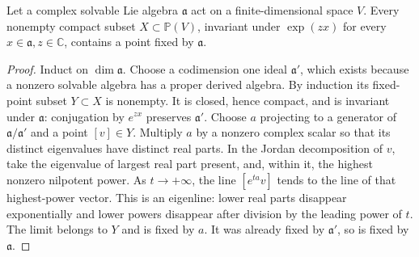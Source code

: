 \begin{lemma}
\label{supp:solvable-projective-fixed}
Let a complex solvable Lie algebra \(\mathfrak a\) act on a
finite-dimensional space \(V\). Every nonempty compact subset
\(X\subset\mathbb P(V)\), invariant under
\(\exp(zx)\) for every \(x\in\mathfrak a,z\in\mathbb C\),
contains a point fixed by \(\mathfrak a\).
\end{lemma}
\begin{proof}
Induct on \(\dim\mathfrak a\). Choose a codimension one ideal
\(\mathfrak a'\), which exists because a nonzero solvable
algebra has a proper derived algebra.
By induction its fixed-point subset \(Y\subset X\)
is nonempty. It is closed, hence compact, and is invariant
under \(\mathfrak a\): conjugation by \(e^{zx}\) preserves
\(\mathfrak a'\). Choose \(a\) projecting to a generator
of \(\mathfrak a/\mathfrak a'\) and a point \([v]\in Y\).
Multiply \(a\) by a nonzero complex scalar so that its
distinct eigenvalues have distinct real parts.
In the Jordan decomposition of \(v\), take the eigenvalue
of largest real part present, and, within it, the highest
nonzero nilpotent power. As \(t\to+\infty\), the line
\([e^{ta}v]\) tends to the line of that highest-power
vector. This is an eigenline: lower real parts disappear
exponentially and lower powers disappear after division
by the leading power of \(t\). The limit belongs to \(Y\)
and is fixed by \(a\). It was already fixed by
\(\mathfrak a'\), so is fixed by \(\mathfrak a\).
\end{proof}

